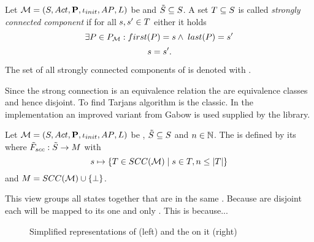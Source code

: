 \documentclass[preview]{standalone}
\begin{document}
\begin{definition}
	Let ${{{\mathcal{M}}}} = {{({S}, {Act}, {\textbf{P}}, {\iota_{init}}, {AP}, {L})}}$ be \achgphN and ${\tilde{{S}}} \subseteq {S}$. A set ${T} \subseteq {S}$ is called \emph{strongly connected component} if for all ${s}, {s}' \in {T}$ either it holds
	\[
		\exists \path \in \pathset : \pfirst(\path) = \state \land \; \plast(\path) = \state'
	\]
	{}
	\[
	 {s} = {s}'\text{.}
	\]
	
	\noindent
	The set of all strongly connected components of \chgph is denoted with \setscc.
\end{definition}

Since the strong connection is an equivalence relation the \sccsN are equivalence classes and hence disjoint. To find \sccsN Tarjans algorithm is the classic. In the implementation an improved variant from Gabow is used supplied by the \jgrapht library. 

\begin{definition}
	Let ${{{\mathcal{M}}}} = {{({S}, {Act}, {\textbf{P}}, {\iota_{init}}, {AP}, {L})}}$ be \achgphN, ${\tilde{{S}}} \subseteq {S}$ and $n \in {\mathbb{N}}$. The \viewN \viewscc is defined by its \grpfctN where ${{\tilde{F}_{{scc}}}} : {\tilde{{S}}} \to {\ensuremath{{M}}}$ with
	\[
	{s} \mapsto \{{T} \in {SCC(\ensuremath{{{{\mathcal{M}}}}})} \mid {s} \in {T}, n \leq |{T}|\}
	\]
	and ${{M}} = {SCC({{{\mathcal{M}}}})} \cup {\{\bot\}}$.
\end{definition}

This view groups all states together that are in the same \sccN. Because \sccsN are disjoint each \state will be mapped to its one and only \sccN. This is because... 

\begin{figure}[h]
	\begin{minipage}{.55\textwidth}
		\hspace{5mm}
		
	\end{minipage}
	\begin{minipage}{.5\textwidth}
		
	\end{minipage}
		\caption{Simplified representations of \mdp (left) and the \viewN \viewscc on it (right)}
		\label{fig:sccMin2}  
\end{figure}
\end{document}
